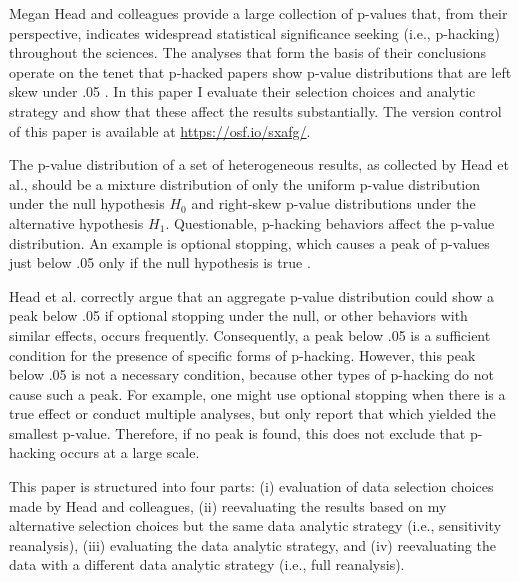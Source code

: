Megan Head and colleagues provide a large collection of p-values that, from their perspective, indicates widespread statistical significance seeking (i.e., p-hacking) throughout the sciences. The analyses that form the basis of their conclusions operate on the tenet that p-hacked papers show p-value distributions that are left skew under .05 \cite{Simonsohn2014}. In this paper I evaluate their selection choices and analytic strategy and show that these affect the results substantially. The version control of this paper is available at \href{https://osf.io/sxafg/}{https://osf.io/sxafg/}.

The p-value distribution of a set of heterogeneous results, as collected by Head et al., should be a mixture distribution of only the uniform p-value distribution under the null hypothesis $H_0$ and right-skew p-value distributions under the alternative hypothesis $H_1$. Questionable, p-hacking behaviors affect the p-value distribution. An example is optional stopping, which causes a peak of p-values just below .05 only if the null hypothesis is true \cite{Lakens_2014}.

Head et al. correctly argue that an aggregate p-value distribution could show a peak below .05 if optional stopping under the null, or other behaviors with similar effects, occurs frequently. Consequently, a peak below .05 is a sufficient condition for the presence of specific forms of p-hacking. However, this peak below .05 is not a necessary condition, because other types of p-hacking do not cause such a peak. For example, one might use optional stopping when there is a true effect \cite{Lakens_2014} or conduct multiple analyses, but only report that which yielded the smallest p-value. Therefore, if no peak is found, this does not exclude that p-hacking occurs at a large scale.  

This paper is structured into four parts: (i) evaluation of data selection choices made by Head and colleagues, (ii) reevaluating the results based on my alternative selection choices but the same data analytic strategy (i.e., sensitivity reanalysis), (iii) evaluating the data analytic strategy, and (iv) reevaluating the data with a different data analytic strategy (i.e., full reanalysis). 
  
  
  